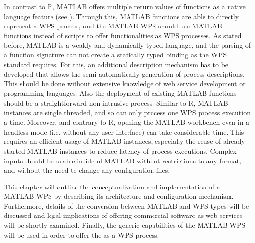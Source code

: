	In contrast to R, MATLAB offers multiple return values of functions as a native language feature (see ). Through this, MATLAB functions are able to directly represent a \ac{WPS} process, and the MATLAB WPS should use MATLAB functions instead of scripts to offer functionalities as WPS processes. As stated before, MATLAB is a weakly and dynamically typed language, and the parsing of a function signature can not create a statically typed binding as the \ac{WPS} standard requires. For this, an additional description mechanism has to be developed that allows the semi-automatically generation of process descriptions. This should be done without extensive knowledge of web service development or programming languages. Also the deployment of existing MATLAB functions should be a straightforward non-intrusive process. Similar to R, MATLAB instances are single threaded, and so can only process one WPS process execution a time. Moreover, and contrary to R, opening the MATLAB workbench even in a headless mode (i.e. without any user interface) can take considerable time. This requires an efficient usage of MATLAB instances, especially the reuse of already started MATLAB instances to reduce latency of process executions. Complex inputs should be usable inside of MATLAB without restrictions to any format, and without the need to change any configuration files.

	

  	This chapter will outline the conceptualization and implementation of a MATLAB WPS by describing its architecture and configuration mechanism. Furthermore, details of the conversion between MATLAB and WPS types will be discussed and legal implications of offering commercial software as web services will be shortly examined. Finally, the generic capabilities of the MATLAB WPS will be used in order to offer the \la as a WPS process.

